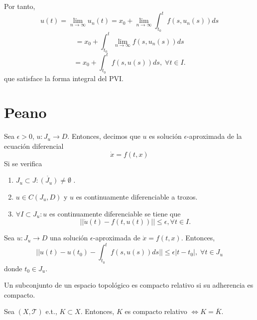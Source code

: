 \begin{dem}
\begin{enumerate}[label=(\roman*)]
      Por tanto, 
      \[ 
        u(t) = \lim_{n \to \infty} u_{n}(t) = x_{0} + \lim_{n \to \infty} \int_{t_{0}}^{t} f(s,u_{n}(s)) ds
      \] 
      \[ 
        = x_{0} + \int_{t_{0}}^{t} \lim_{n \to \infty} f(s,u_{n}(s)) ds
      \] 
      \[ 
        = x_{0} + \int_{t_{0}}^{t} f(s, u(s)) ds, \; \forall t \in I. 
      \] 
      que satisface la forma integral del PVI.
  \end{enumerate}
\end{dem}

\section{Peano}

\begin{defn}
  Sea $\epsilon > 0$, $u: J_{u} \to D$. Entonces, decimos que $u$ es solución $\epsilon$-aproximada de la ecuación diferencial \[ 
    \dot{x} = f(t,x) 
  \] 
  Si se verifica
  \begin{enumerate}[label=(\roman*)]
    \item $J_{u} \subset J : \mathring{(J_{u})} \neq \emptyset$ .
    \item $u \in C(J_{u}, D)$ y $u$ es continuamente diferenciable a trozos.
    \item $\forall I \subset J_{u}: u$ es continuamente diferenciable se tiene que
      \[ 
        ||\dot{u}(t) - f(t, u(t))|| \leq \epsilon, \forall t \in I. 
      \] 
  \end{enumerate}
\end{defn}

\begin{obs}
  Sea $u : J_{u} \to D$ una solución $\epsilon$-aproximada de $\dot{x} = f(t,x)$. Entonces,
  \[ 
    ||u(t) - u(t_{0}) - \int_{t_{0}}^{t} f(s, u(s)) ds|| \leq \epsilon | t - t_{0} |, \; \forall t \in J_{u}
  \] 
  donde $t_{0} \in J_{u}$.
\end{obs}

\begin{defn}
  Un subconjunto de un espacio topológico es compacto relativo si su adherencia es compacto.
\end{defn}

\begin{prop}
  Sea $( X, \mathcal{T} )$ e.t., $K \subset X$. Entonces, $K$ es compacto relativo $\Leftrightarrow K = \overline{K}$.
\end{prop}

